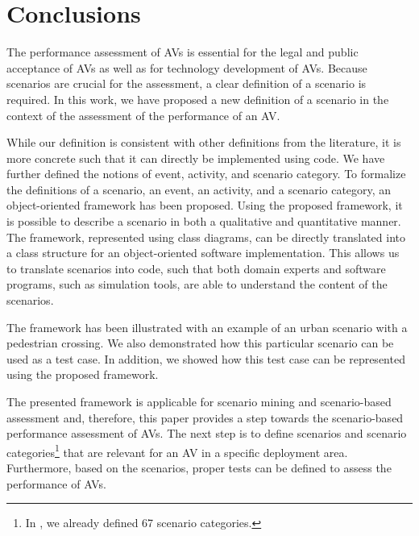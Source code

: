 \section{Conclusions}
\label{sec:conclusion}

The performance assessment of AVs is essential for the legal and public acceptance of AVs as well as for technology development of AVs. 
Because scenarios are crucial for the assessment, a clear definition of a scenario is required.
In this work, we have proposed a new definition of a scenario in the context of the assessment of the performance of an AV. 
 
While our definition is consistent with other definitions from the literature, it is more concrete such that it can directly be implemented using code.
We have further defined the notions of event, activity, and scenario category. 
To formalize the definitions of a scenario, an event, an activity, and a scenario category, an \cstartb object-oriented framework \cendb has been proposed. Using the proposed \cstartb framework\cendb, it is possible to describe a scenario in both a qualitative and quantitative manner. The \cstartb framework\cendb, represented using \cstartb class diagrams\cendb, can be directly translated into a class structure for an object-oriented software implementation. This allows us to translate scenarios into code, such that both domain experts and software programs, such as simulation tools, are able to understand the content of the scenarios. 

The \cstartb framework \cendb has been illustrated with an example of an urban scenario with a pedestrian crossing. 
We also demonstrated how this particular scenario can be used as a test case. In addition, we showed how this test case can be represented using the proposed \cstartb framework\cendb.

The presented \cstartb framework \cendb is applicable for scenario mining \autocite{paardekooper2019dataset6000km} and scenario-based assessment \autocite{elrofai2018scenario} and, therefore, this paper provides a step towards the scenario-based performance assessment of AVs. The next step is to define scenarios and scenario categories\footnote{ In \autocite{degelder2019scenariocategories}, we already defined 67 scenario categories.} that are relevant for an AV in a specific deployment area. Furthermore, based on the scenarios, proper tests can be defined to assess the performance of AVs. 

